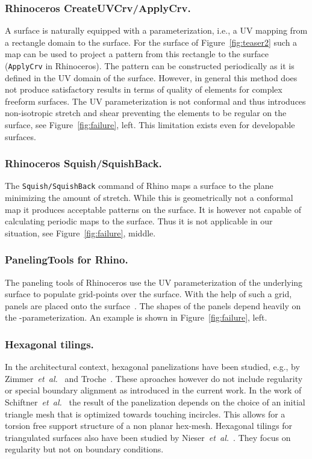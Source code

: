 \documentclass[Thesis.tex]{subfiles}
\begin{document}
\subsubsection{Rhinoceros CreateUVCrv/ApplyCrv.}
A \nurbs surface is naturally equipped with a parameterization, i.e.,
a UV mapping from a rectangle domain to the surface. For the surface
of Figure~\ref{fig:teaser2} such a map can be used to project a pattern
from this rectangle to the surface ({\tt ApplyCrv} in Rhinoceros). The
pattern can be constructed periodically as it is defined in the UV
domain of the surface. However, in general this method does not
produce satisfactory results in terms of quality of elements for
complex freeform surfaces. The UV parameterization is not conformal
and thus introduces non-isotropic stretch and shear preventing the
elements to be regular on the surface, see Figure~\ref{fig:failure},
left. This limitation exists even for developable surfaces.

\subsubsection{Rhinoceros Squish/SquishBack.}
The {\tt Squish/SquishBack} command of Rhino maps a surface to the
plane minimizing the amount of stretch. While this is geometrically
not a conformal map it produces acceptable patterns on the surface. It
is however not capable of calculating periodic maps to the surface.
Thus it is not applicable in our situation, see
Figure~\ref{fig:failure}, middle.

\subsubsection{PanelingTools for Rhino.}
The paneling tools of Rhinoceros use the UV parameterization of the
underlying surface to populate grid-points over the surface. With the
help of such a grid, panels are placed onto the surface~\cite{panelingtools}. 
The shapes of the panels depend heavily on
the \nurbs-parameterization. An example is shown in
Figure~\ref{fig:failure}, left.

\subsubsection{Hexagonal tilings.}
In the architectural context, hexagonal panelizations have been
studied, e.g., by Zimmer~\emph{et~al.}~\cite{ZimmerCHK2013} and Troche~\cite{Troche2008}. 
These aproaches however do not include regularity or special boundary
alignment as introduced in the current work. In the work of 
Schiftner~\emph{et~al.}~\cite{SchiftnerHWP2009} the
result of the panelization depends on the choice of an initial
triangle mesh that is optimized towards touching incircles. This
allows for a torsion free support structure of a non planar
hex-mesh. Hexagonal tilings for triangulated surfaces also have been
studied by Nieser~\emph{et~al.}~\cite{NieserPPZ2012}. They focus on regularity but not on
boundary conditions.
\end{document}
